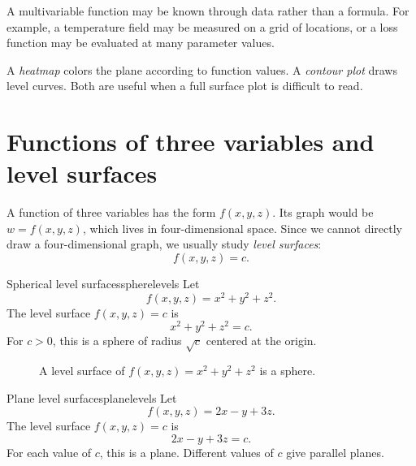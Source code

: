 \documentclass[11pt]{article}
\begin{document}
A multivariable function may be known through data rather than a formula. For example, a temperature field may be measured on a grid of locations, or a loss function may be evaluated at many parameter values.

A \emph{heatmap} colors the plane according to function values. A \emph{contour plot} draws level curves. Both are useful when a full surface plot is difficult to read.

\section{Functions of three variables and level surfaces}

A function of three variables has the form $f(x,y,z)$. Its graph would be $w=f(x,y,z)$, which lives in four-dimensional space. Since we cannot directly draw a four-dimensional graph, we usually study \emph{level surfaces}:
\[
f(x,y,z)=c.
\]

\begin{workedexample}{Spherical level surfaces}{spherelevels}
Let
\[
f(x,y,z)=x^2+y^2+z^2.
\]
The level surface $f(x,y,z)=c$ is
\[
x^2+y^2+z^2=c.
\]
For $c>0$, this is a sphere of radius $\sqrt c$ centered at the origin.
\end{workedexample}

\begin{figure}[H]
\centering
{}
\caption{A level surface of $f(x,y,z)=x^2+y^2+z^2$ is a sphere.}
\end{figure}

\begin{workedexample}{Plane level surfaces}{planelevels}
Let
\[
f(x,y,z)=2x-y+3z.
\]
The level surface $f(x,y,z)=c$ is
\[
2x-y+3z=c.
\]
For each value of $c$, this is a plane. Different values of $c$ give parallel planes.
\end{workedexample}
\end{document}
